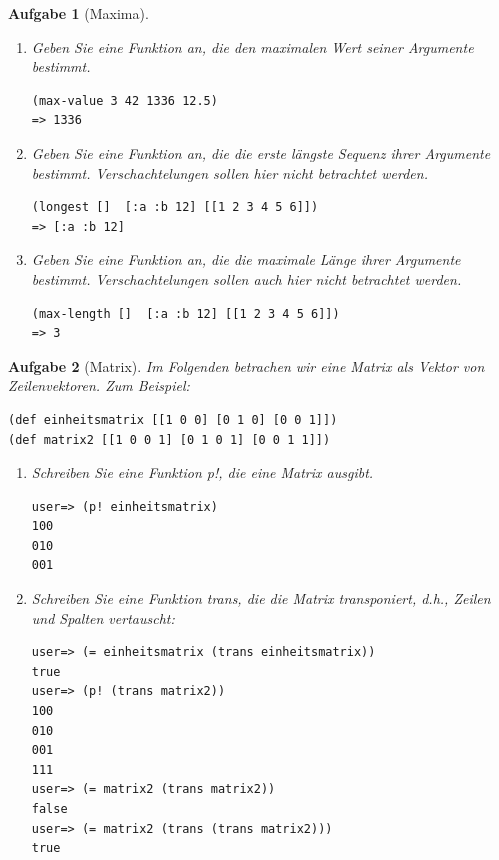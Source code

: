 \documentclass[11pt,a4paper]{article}
\newcounter{numb}
\theoremstyle{break}
\newtheorem{aufgabe}{Aufgabe}[numb]
\begin{document}
\pagebreak

\begin{aufgabe}[Maxima]

\begin{enumerate}[label=\alph*)]
\item
  Geben Sie eine Funktion an, die den maximalen Wert seiner Argumente bestimmt.
\begin{verbatim}
(max-value 3 42 1336 12.5)
=> 1336
\end{verbatim}
\item
  Geben Sie eine Funktion an, die die erste l\"angste Sequenz ihrer Argumente bestimmt. Verschachtelungen sollen hier nicht betrachtet werden.
\begin{verbatim}
(longest []  [:a :b 12] [[1 2 3 4 5 6]])
=> [:a :b 12]
\end{verbatim}
\item
  Geben Sie eine Funktion an, die die maximale L\"ange ihrer Argumente bestimmt. Verschachtelungen sollen auch hier nicht betrachtet werden.
\begin{verbatim}
(max-length []  [:a :b 12] [[1 2 3 4 5 6]])
=> 3
\end{verbatim}

\end{enumerate}
\end{aufgabe}



\begin{aufgabe}[Matrix]
Im Folgenden betrachen wir eine Matrix als Vektor von Zeilenvektoren. Zum Beispiel:
\begin{verbatim}
(def einheitsmatrix [[1 0 0] [0 1 0] [0 0 1]])
(def matrix2 [[1 0 0 1] [0 1 0 1] [0 0 1 1]])
\end{verbatim}

\begin{enumerate}[label=\alph*)]
\item Schreiben Sie eine Funktion p!, die eine Matrix ausgibt. 
\begin{verbatim}
user=> (p! einheitsmatrix)
100
010
001
\end{verbatim}
  
\item Schreiben Sie eine Funktion trans, die die Matrix transponiert, d.h., Zeilen und Spalten vertauscht:
\begin{verbatim}
user=> (= einheitsmatrix (trans einheitsmatrix))
true
user=> (p! (trans matrix2))
100
010
001
111
user=> (= matrix2 (trans matrix2))
false
user=> (= matrix2 (trans (trans matrix2)))
true 
\end{verbatim}
\end{enumerate}

\end{aufgabe}
\end{document}
